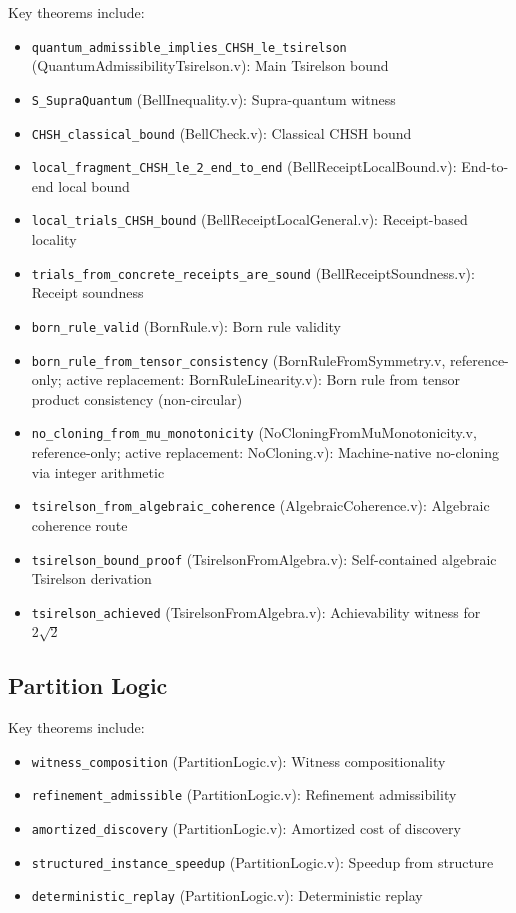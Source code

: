 Key theorems include:
\begin{itemize}
    \item \texttt{quantum\_admissible\_implies\_CHSH\_le\_tsirelson} (QuantumAdmissibilityTsirelson.v): Main Tsirelson bound
    \item \texttt{S\_SupraQuantum} (BellInequality.v): Supra-quantum witness
    \item \texttt{CHSH\_classical\_bound} (BellCheck.v): Classical CHSH bound
    \item \texttt{local\_fragment\_CHSH\_le\_2\_end\_to\_end} (BellReceiptLocalBound.v): End-to-end local bound
    \item \texttt{local\_trials\_CHSH\_bound} (BellReceiptLocalGeneral.v): Receipt-based locality
    \item \texttt{trials\_from\_concrete\_receipts\_are\_sound} (BellReceiptSoundness.v): Receipt soundness
    \item \texttt{born\_rule\_valid} (BornRule.v): Born rule validity
    \item \texttt{born\_rule\_from\_tensor\_consistency} (BornRuleFromSymmetry.v, reference-only; active replacement: BornRuleLinearity.v): Born rule from tensor product consistency (non-circular)
    \item \texttt{no\_cloning\_from\_mu\_monotonicity} (NoCloningFromMuMonotonicity.v, reference-only; active replacement: NoCloning.v): Machine-native no-cloning via integer arithmetic
    \item \texttt{tsirelson\_from\_algebraic\_coherence} (AlgebraicCoherence.v): Algebraic coherence route
    \item \texttt{tsirelson\_bound\_proof} (TsirelsonFromAlgebra.v): Self-contained algebraic Tsirelson derivation
    \item \texttt{tsirelson\_achieved} (TsirelsonFromAlgebra.v): Achievability witness for $2\sqrt{2}$
\end{itemize}

\subsection{Partition Logic}

Key theorems include:
\begin{itemize}
    \item \texttt{witness\_composition} (PartitionLogic.v): Witness compositionality
    \item \texttt{refinement\_admissible} (PartitionLogic.v): Refinement admissibility
    \item \texttt{amortized\_discovery} (PartitionLogic.v): Amortized cost of discovery
    \item \texttt{structured\_instance\_speedup} (PartitionLogic.v): Speedup from structure
    \item \texttt{deterministic\_replay} (PartitionLogic.v): Deterministic replay
\end{itemize}

